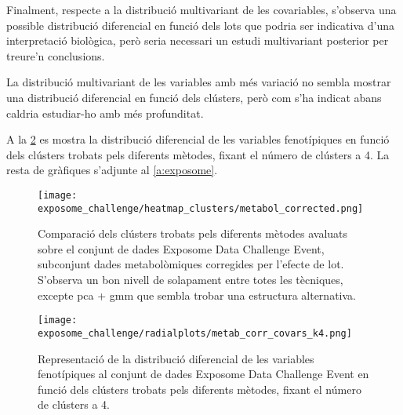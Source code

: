 \documentclass[CAT,BIB]{TFUOC}%
\begin{document}
        Finalment,
        respecte a la distribució multivariant de les covariables,
        s'observa una possible distribució diferencial en funció dels lots
        que podria ser indicativa d'una interpretació biològica,
        però seria necessari un estudi multivariant posterior
        per treure'n conclusions.

        La distribució multivariant de les variables amb més variació
        no sembla mostrar una distribució diferencial en funció dels clústers,
        però com s'ha indicat abans caldria estudiar-ho amb més profunditat.

        A la \cref{f:expsome_radialplot} es mostra la distribució diferencial
        de les variables fenotípiques
        en funció dels clústers trobats pels diferents mètodes,
        fixant el número de clústers a 4.
        La resta de gràfiques s'adjunte al \cref{a:exposome}.

        \begin{figure}[p]
            \centering
            \texttt{[image: exposome\_challenge/heatmap\_clusters/metabol\_corrected.png]}
            \caption[Comparació dels clústers pel conjunt de dades Exposome Data Challenge Event]{
                Comparació dels clústers trobats pels diferents mètodes avaluats
                sobre el conjunt de dades Exposome Data Challenge Event,
                subconjunt dades metabolòmiques corregides per l'efecte de lot.
                S'observa un bon nivell de solapament entre totes les tècniques,
                excepte \gls{pca} + \gls{gmm} que sembla trobar una estructura alternativa.
            }
            \label{f:expsome_heatmap}
        \end{figure}

        \begin{figure}[p]
            \centering
            \texttt{[image: exposome\_challenge/radialplots/metab\_corr\_covars\_k4.png]}
            \caption[Distribució diferencial de les variables fenotip a Exposome Data Challenge Event]{
                Representació de la distribució diferencial
                de les variables fenotípiques al conjunt de dades Exposome Data Challenge Event
                en funció dels clústers trobats pels diferents mètodes,
                fixant el número de clústers a 4.
            }
            \label{f:expsome_radialplot}
        \end{figure}
\end{document}

